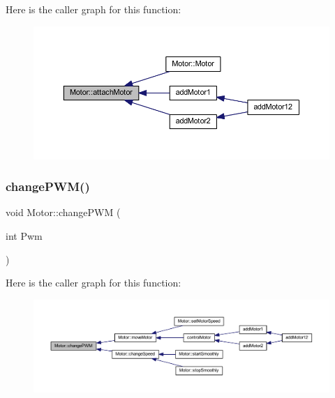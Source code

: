 Here is the caller graph for this function\+:
\nopagebreak
\begin{figure}[H]
\begin{center}
\leavevmode
\includegraphics[width=350pt]{d1/d6b/class_motor_a6726cda4183f9b9f4fd3d8af52d9e87d_icgraph}
\end{center}
\end{figure}
\mbox{\label{class_motor_aea0ccda5c88406ca40b2d2283eab9114}} 
\subsubsection{\texorpdfstring{change\+P\+W\+M()}{changePWM()}}
{\footnotesize\ttfamily void Motor\+::change\+P\+WM (\begin{DoxyParamCaption}\item[{int}]{Pwm }\end{DoxyParamCaption})}

Here is the caller graph for this function\+:
\nopagebreak
\begin{figure}[H]
\begin{center}
\leavevmode
\includegraphics[width=350pt]{d1/d6b/class_motor_aea0ccda5c88406ca40b2d2283eab9114_icgraph}
\end{center}
\end{figure}
\mbox{\label{class_motor_a6b966366a7a184ae6b3c3227f5d57213}} 

